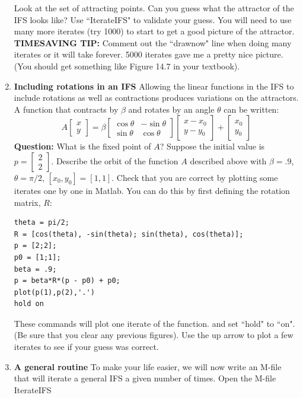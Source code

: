 \documentclass[12pt]{article}
\begin{document}
\begin{enumerate}
Look at the set of attracting points.  Can you guess what the attractor of the IFS looks like?  Use ``IterateIFS" to validate your guess.  You will need to use many more iterates (try 1000) to start to get a good picture of the attractor.  {\bf TIMESAVING TIP:} Comment out the ``drawnow" line when doing many iterates or it will take forever.  5000 iterates gave me a pretty nice picture.   (You should get something like Figure 14.7 in your textbook).
\item {\bf Including rotations in an IFS}  Allowing the linear functions in the IFS to  include rotations as well as contractions produces variations on the attractors.
A function that contracts by $\beta$ and rotates by an angle $\theta$ can be written:
$$ A \left[\begin{array}{c}x \\y\end{array}\right] = \beta \left[\begin{array}{cc}\cos \theta & - \sin \theta \\\sin \theta & \cos \theta\end{array}\right]
\left[\begin{array}{c}x - x_0 \\y - y_0\end{array}\right] + \left[\begin{array}{c} x_0 \\ y_0\end{array}\right] $$
{\bf Question:} What is the fixed point of $A$?
\vskip 4pt
\noindent
Suppose the initial value is $p = \left[\begin{array}{c}2 \\2\end{array}\right]$.  Describe the orbit of the function $A$ described above with $\beta = .9$,  $\theta = \pi/2$, $[x_0, y_0] = [1,1]$.  Check that you are correct by plotting some iterates one by one in Matlab.   You can do this by first defining the rotation matrix, $R$:
\begin{verbatim}
theta = pi/2;
R = [cos(theta), -sin(theta); sin(theta), cos(theta)];
p = [2;2];
p0 = [1;1];
beta = .9;
p = beta*R*(p - p0) + p0;
plot(p(1),p(2),'.')
hold on
\end{verbatim}
These commands will plot one iterate of the function. and set ``hold" to ``on".  (Be sure that you clear any previous figures).  
Use the up arrow to plot a few iterates to see if your guess was correct.
\item {\bf A general routine}  To make your life easier, we will now write an M-file that will iterate a general IFS a given number of times.  Open the M-file IterateIFS

\end{enumerate}
\end{document}
